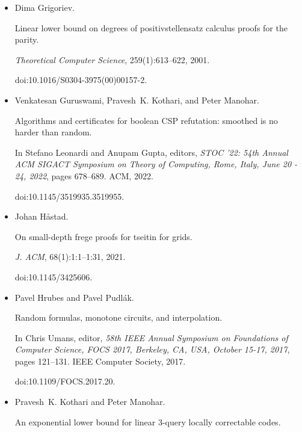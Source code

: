 \documentclass[10pt,a4paper]{article}
\begin{document}
\begin{itemize}
\item[] 
[22]

Dima Grigoriev.


Linear lower bound on degrees of positivstellensatz calculus proofs
for the parity.


\emph{Theoretical Computer Science}, 259(1):613–622, 2001.


doi:10.1016/S0304-3975(00)00157-2.





\item[] 
[23]

Venkatesan Guruswami, Pravesh K. Kothari, and Peter Manohar.


Algorithms and certificates for boolean CSP refutation: smoothed is
no harder than random.


In Stefano Leonardi and Anupam Gupta, editors, \emph{STOC ’22: 54th
Annual ACM SIGACT Symposium on Theory of Computing, Rome, Italy, June 20
- 24, 2022}, pages 678–689. ACM, 2022.


doi:10.1145/3519935.3519955.





\item[] 
[24]

Johan Håstad.


On small-depth frege proofs for tseitin for grids.


\emph{J. ACM}, 68(1):1:1–1:31, 2021.


doi:10.1145/3425606.





\item[] 
[25]

Pavel Hrubes and Pavel Pudlák.


Random formulas, monotone circuits, and interpolation.


In Chris Umans, editor, \emph{58th IEEE Annual Symposium on
Foundations of Computer Science, FOCS 2017, Berkeley, CA, USA, October
15-17, 2017}, pages 121–131. IEEE Computer Society, 2017.


doi:10.1109/FOCS.2017.20.





\item[] 
[26]

Pravesh K. Kothari and Peter Manohar.


An exponential lower bound for linear 3-query locally correctable
codes.



\end{itemize}
\end{document}
